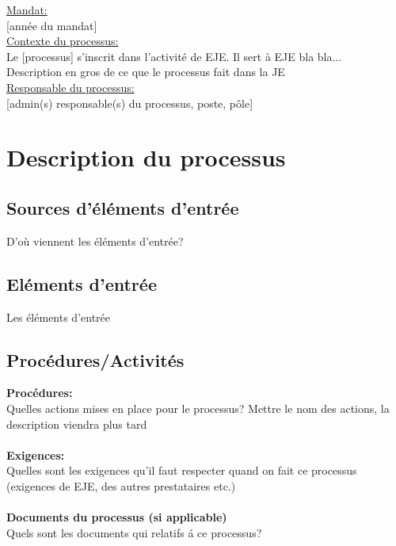 \documentclass[12pt]{article}
\begin{document}


\bigskip

\underline{Mandat:}\\

[année du mandat]
\\

\underline{Contexte du processus:}\\

Le [processus] s'inscrit dans l'activité de EJE. Il sert à EJE bla bla...
\\
Description en gros de ce que le processus fait dans la JE
\\

\underline{Responsable du processus:}
\\

[admin(s) responsable(s) du processus, poste, pôle]


\section*{Description du processus}


\subsection*{Sources d'éléments d'entrée}
D'où viennent les éléments d'entrée?
\subsection*{Eléments d'entrée}
 Les éléments d'entrée
 
 \subsection*{Procédures/Activités}
\noindent
\textbf{Procédures:}\\
Quelles actions mises en place pour le processus? Mettre le nom des actions, la description viendra plus tard
\\
\\
\textbf{Exigences:}\\
Quelles sont les exigences qu'il faut respecter quand on fait ce processus (exigences de EJE, des autres prestataires etc.)
\\
\\
\textbf{Documents du processus (si applicable)}\\
Quels sont les documents qui relatifs á ce processus?
\end{document}
